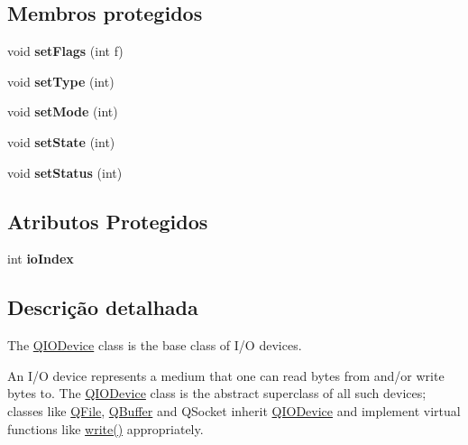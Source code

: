 \subsection*{Membros protegidos}
\begin{DoxyCompactItemize}
\item 
\hypertarget{class_q_i_o_device_a9f29e5457641fae1b405b144a8206ca5}{void {\bfseries set\-Flags} (int f)}\label{class_q_i_o_device_a9f29e5457641fae1b405b144a8206ca5}

\item 
\hypertarget{class_q_i_o_device_aa41c1899c8cdb367661ec403982d1199}{void {\bfseries set\-Type} (int)}\label{class_q_i_o_device_aa41c1899c8cdb367661ec403982d1199}

\item 
\hypertarget{class_q_i_o_device_a7992c72160a65bc47f44d0d4002cb1c2}{void {\bfseries set\-Mode} (int)}\label{class_q_i_o_device_a7992c72160a65bc47f44d0d4002cb1c2}

\item 
\hypertarget{class_q_i_o_device_ab9189a00434da3f208a730a5deae4337}{void {\bfseries set\-State} (int)}\label{class_q_i_o_device_ab9189a00434da3f208a730a5deae4337}

\item 
\hypertarget{class_q_i_o_device_a8ecca54834bee96d3b75cb0b6cff0eac}{void {\bfseries set\-Status} (int)}\label{class_q_i_o_device_a8ecca54834bee96d3b75cb0b6cff0eac}

\end{DoxyCompactItemize}
\subsection*{Atributos Protegidos}
\begin{DoxyCompactItemize}
\item 
\hypertarget{class_q_i_o_device_a8e1a0aabb56d3acb6a7ace40493e79ff}{int {\bfseries io\-Index}}\label{class_q_i_o_device_a8e1a0aabb56d3acb6a7ace40493e79ff}

\end{DoxyCompactItemize}


\subsection{Descrição detalhada}
The \hyperlink{class_q_i_o_device}{Q\-I\-O\-Device} class is the base class of I/\-O devices. 

An I/\-O device represents a medium that one can read bytes from and/or write bytes to. The \hyperlink{class_q_i_o_device}{Q\-I\-O\-Device} class is the abstract superclass of all such devices; classes like \hyperlink{class_q_file}{Q\-File}, \hyperlink{class_q_buffer}{Q\-Buffer} and Q\-Socket inherit \hyperlink{class_q_i_o_device}{Q\-I\-O\-Device} and implement virtual functions like \hyperlink{structcmd_8h_af2a3ea719b83f672637febdd87c36c36}{write()} appropriately.

